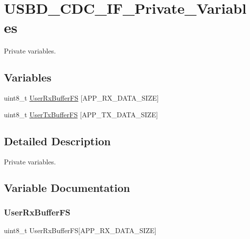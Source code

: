 \hypertarget{group__USBD__CDC__IF__Private__Variables}{}\section{U\+S\+B\+D\+\_\+\+C\+D\+C\+\_\+\+I\+F\+\_\+\+Private\+\_\+\+Variables}
\label{group__USBD__CDC__IF__Private__Variables}


Private variables.  


\subsection*{Variables}
\begin{DoxyCompactItemize}
\item 
uint8\+\_\+t \hyperlink{group__USBD__CDC__IF__Private__Variables_ga1e37e6616e6affe5acf9c0befd063f6a}{User\+Rx\+Buffer\+FS} \mbox{[}A\+P\+P\+\_\+\+R\+X\+\_\+\+D\+A\+T\+A\+\_\+\+S\+I\+ZE\mbox{]}
\item 
uint8\+\_\+t \hyperlink{group__USBD__CDC__IF__Private__Variables_gad48fea85cdb7aed49bf62140a52f23e0}{User\+Tx\+Buffer\+FS} \mbox{[}A\+P\+P\+\_\+\+T\+X\+\_\+\+D\+A\+T\+A\+\_\+\+S\+I\+ZE\mbox{]}
\end{DoxyCompactItemize}


\subsection{Detailed Description}
Private variables. 



\subsection{Variable Documentation}
\mbox{\label{group__USBD__CDC__IF__Private__Variables_ga1e37e6616e6affe5acf9c0befd063f6a}} 
\subsubsection{\texorpdfstring{User\+Rx\+Buffer\+FS}{UserRxBufferFS}}
{\footnotesize\ttfamily uint8\+\_\+t User\+Rx\+Buffer\+FS\mbox{[}A\+P\+P\+\_\+\+R\+X\+\_\+\+D\+A\+T\+A\+\_\+\+S\+I\+ZE\mbox{]}}

